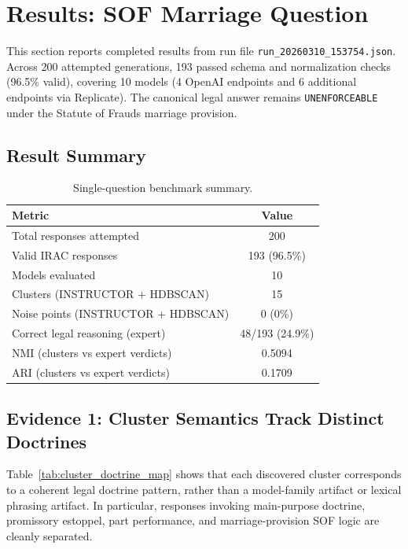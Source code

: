 \documentclass[11pt]{article}
\begin{document}
\section{Results: SOF Marriage Question}
This section reports completed results from run file \texttt{run\_20260310\_153754.json}. Across 200 attempted generations, 193 passed schema and normalization checks (96.5\% valid), covering 10 models (4 OpenAI endpoints and 6 additional endpoints via Replicate). The canonical legal answer remains \texttt{UNENFORCEABLE} under the Statute of Frauds marriage provision.

\subsection{Result Summary}
\begin{table}[ht]
\centering
\caption{Single-question benchmark summary.}
\label{tab:result_summary}
\begin{tabular}{lc}
\toprule
Metric & Value \\
\midrule
Total responses attempted & 200 \\
Valid IRAC responses & 193 (96.5\%) \\
Models evaluated & 10 \\
Clusters (INSTRUCTOR + HDBSCAN) & 15 \\
Noise points (INSTRUCTOR + HDBSCAN) & 0 (0\%) \\
Correct legal reasoning (expert) & 48/193 (24.9\%) \\
NMI (clusters vs expert verdicts) & 0.5094 \\
ARI (clusters vs expert verdicts) & 0.1709 \\
\bottomrule
\end{tabular}
\end{table}

\subsection{Evidence 1: Cluster Semantics Track Distinct Doctrines}
Table~\ref{tab:cluster_doctrine_map} shows that each discovered cluster corresponds to a coherent legal doctrine pattern, rather than a model-family artifact or lexical phrasing artifact. In particular, responses invoking main-purpose doctrine, promissory estoppel, part performance, and marriage-provision SOF logic are cleanly separated.
\end{document}
